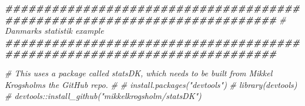 \documentclass[
]{book}
\newenvironment{Shaded}{\begin{snugshade}}{\end{snugshade}}
\newcommand{\CommentTok}[1]{\textcolor[rgb]{0.56,0.35,0.01}{\textit{#1}}}
\newcommand{\DocumentationTok}[1]{\textcolor[rgb]{0.56,0.35,0.01}{\textbf{\textit{#1}}}}
\begin{document}
\begin{Shaded}
\begin{Highlighting}[]
\DocumentationTok{\#\#\#\#\#\#\#\#\#\#\#\#\#\#\#\#\#\#\#\#\#\#\#\#\#\#\#\#\#\#\#\#\#\#\#\#\#\#\#\#\#\#\#\#\#\#\#\#\#\#\#\#\#\#\#\#\#\#\#\#\#\#\#\#\#\#\#\#\#\#\#\#\#}
\CommentTok{\# Danmarks statistik example}
\DocumentationTok{\#\#\#\#\#\#\#\#\#\#\#\#\#\#\#\#\#\#\#\#\#\#\#\#\#\#\#\#\#\#\#\#\#\#\#\#\#\#\#\#\#\#\#\#\#\#\#\#\#\#\#\#\#\#\#\#\#\#\#\#\#\#\#\#\#\#\#\#\#\#\#\#\#}

\CommentTok{\# This uses a package called statsDK, which needs to be built from Mikkel Krogsholm\textquotesingle{}s the GitHub repo.}
\CommentTok{\# }
\CommentTok{\#    install.packages("devtools")}
\CommentTok{\#    library(devtools)}
\CommentTok{\#    devtools::install\_github("mikkelkrogsholm/statsDK")}


\end{Highlighting}
\end{Shaded}
\end{document}
